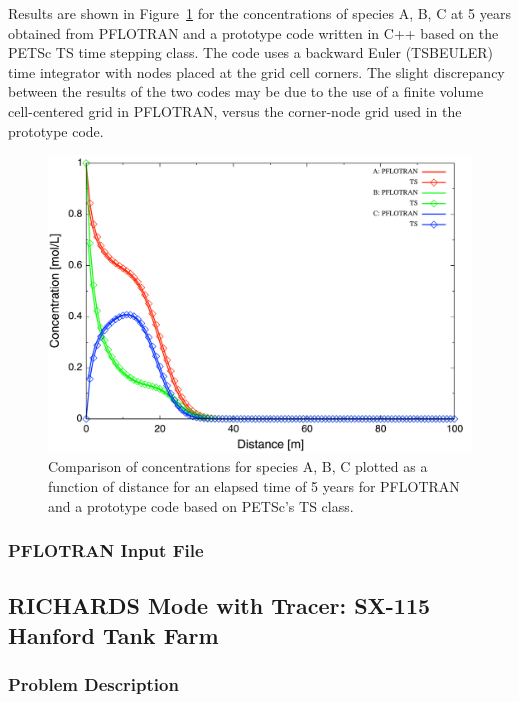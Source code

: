 Results are shown in Figure~\ref{fabc} for the concentrations of species A, B, C at 5 years obtained from PFLOTRAN and a prototype code written in C++ based on the PETSc TS time stepping class. The code uses a backward Euler (TSBEULER) time integrator with nodes placed at the grid cell corners. The slight discrepancy between the results of the two codes may be due to the use of a finite volume cell-centered grid in PFLOTRAN, versus the corner-node grid used in the prototype code.

\begin{figure}[h]\centering
\includegraphics[scale=0.5]{./figs/abc}
\caption{Comparison of concentrations for species A, B, C plotted as a function of distance for an elapsed time of 5 years for PFLOTRAN and a prototype code based on PETSc's TS class.}\label{fabc}
\end{figure}

\subsubsection{PFLOTRAN Input File}

\scriptsize
{}\label{tabc}
\normalsize

\newpage

\subsection{RICHARDS Mode with Tracer: SX-115 Hanford Tank Farm}

\subsubsection{Problem Description}

